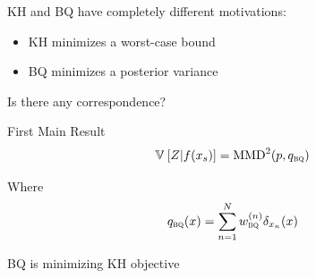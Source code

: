 \documentclass[usenames,dvipsnames]{beamer}
\begin{document}
\begin{frame}[plain, t]
	\titlebodyskip
 \slidebody
	{

		KH and BQ have completely different motivations:
		\begin{itemize}
			\item KH minimizes a worst-case bound
			\item BQ minimizes a posterior variance
		\end{itemize}
		Is there any correspondence?
	\pause
	\begin{block}{First Main Result}
	\begin{align*}
		\mathbb{V}_{} \left[ {Z \vert f(x_s)} \right] = {\rm MMD}^2(p,q_{{\textsc{bq}}{}})
	\end{align*}		

		
		Where  $$q_{{\textsc{bq}}{}}(x) = \sum_{n=1}^{N}w^{(n)}_{{\textsc{bq}}{}}\delta_{x_n}(x)$$ 
	\end{block}		

	}
	\pause
	
	\vspace{0.7in}

	\takeaway
{
BQ is minimizing KH objective
}
\end{frame}
\end{document}
